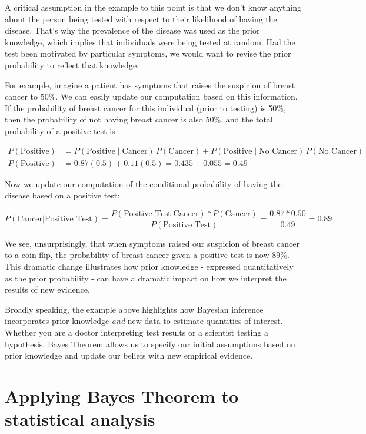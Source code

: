 \documentclass[
]{book}
\begin{document}
A critical assumption in the example to this point is that we don't know
anything about the person being tested with respect to their likelihood
of having the disease. That's why the prevalence of the disease was used
as the prior knowledge, which implies that individuals were being tested
at random. Had the test been motivated by particular symptoms, we would
want to revise the prior probability to reflect that knowledge.

For example, imagine a patient has symptoms that raises the suspicion of
breast cancer to 50\%. We can easily update our computation based on this
information. If the probability of breast cancer for this individual
(prior to testing) is 50\%, then the probability of not having breast
cancer is also 50\%, and the total probability of a positive test is

\[
\begin{aligned}P(\text{Positive}) &= P(\text{Positive}\mid \text{Cancer})\,P(\text{Cancer})+ P(\text{Positive}\mid \text{No Cancer})\,P(\text{No Cancer}) \\P(\text{Positive}) &= 0.87(0.5) + 0.11(0.5) = 0.435 + 0.055 = 0.49\end{aligned}
\]

Now we update our computation of the conditional probability of having
the disease based on a positive test:

\[
P(\text{Cancer}|\text{Positive Test}) = \frac{P(\text{Positive Test|Cancer})*P(\text{Cancer})}{P(\text{Positive Test})}=\frac{0.87*0.50}{0.49}=0.89
\]

We see, unsurprisingly, that when symptoms raised our suspicion of
breast cancer to a coin flip, the probability of breast cancer given a
positive test is now 89\%. This dramatic change illustrates how prior
knowledge - expressed quantitatively as the prior probability - can have
a dramatic impact on how we interpret the results of new evidence.

Broadly speaking, the example above highlights how Bayesian inference
incorporates prior knowledge \emph{and} new data to estimate quantities of
interest. Whether you are a doctor interpreting test results or a
scientist testing a hypothesis, Bayes Theorem allows us to specify our
initial assumptions based on prior knowledge and update our beliefs with
new empirical evidence.

\section{Applying Bayes Theorem to statistical analysis}\label{applying-bayes-theorem-to-statistical-analysis}
\end{document}
